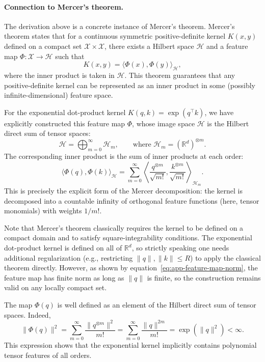 \documentclass{article}
\newcommand{\R}{\mathbb{R}}
\begin{document}
\paragraph{Connection to Mercer's theorem.}
The derivation above is a concrete instance of Mercer's theorem. Mercer’s theorem states that for a continuous symmetric positive-definite kernel $K(x,y)$ defined on a compact set $\mathcal{X}\times\mathcal{X}$, there exists a Hilbert space $\mathcal{H}$ and a feature map $\Phi:\mathcal{X}\to\mathcal{H}$ such that
\begin{equation}
    K(x,y)=\langle\Phi(x),\Phi(y)\rangle_{\mathcal{H}},
\end{equation}
where the inner product is taken in $\mathcal{H}$. This theorem guarantees that any positive-definite kernel can be represented as an inner product in some (possibly infinite-dimensional) feature space.

For the exponential dot-product kernel $K(q,k)=\exp(q^\top k)$, we have explicitly constructed this feature map $\Phi$, whose image space $\mathcal{H}$ is the Hilbert direct sum of tensor spaces:
\begin{equation}
    \mathcal{H}=\bigoplus_{m=0}^{\infty}\mathcal{H}_m,\qquad\text{where }\mathcal{H}_m=(\R^d)^{\otimes m}.
\end{equation}
The corresponding inner product is the sum of inner products at each order:
\begin{equation}
    \langle\Phi(q),\Phi(k)\rangle_{\mathcal{H}}
    =
    \sum_{m=0}^{\infty}
    \left\langle
    \frac{q^{\otimes m}}{\sqrt{m!}},
    \frac{k^{\otimes m}}{\sqrt{m!}}
    \right\rangle_{\mathcal{H}_m}.
\end{equation}
This is precisely the explicit form of the Mercer decomposition: the kernel is decomposed into a countable infinity of orthogonal feature functions (here, tensor monomials) with weights $1/m!$.

Note that Mercer's theorem classically requires the kernel to be defined on a compact domain and to satisfy square-integrability conditions. The exponential dot-product kernel is defined on all of $\R^d$, so strictly speaking one needs additional regularization (e.g., restricting $\|q\|,\|k\|\leq R$) to apply the classical theorem directly. However, as shown by equation~\eqref{eq:app-feature-map-norm}, the feature map has finite norm as long as $\|q\|$ is finite, so the construction remains valid on any locally compact set.

The map $\Phi(q)$ is well defined as an element of the Hilbert direct sum of tensor spaces. Indeed,
\begin{equation}
    \|\Phi(q)\|^2
    =
    \sum_{m=0}^{\infty}
    \frac{\|q^{\otimes m}\|^2}{m!}
    =
    \sum_{m=0}^{\infty}
    \frac{\|q\|^{2m}}{m!}
    =
    \exp(\|q\|^2)
    <
    \infty .
    \label{eq:app-feature-map-norm}
\end{equation}
This expression shows that the exponential kernel implicitly contains polynomial tensor features of all orders.
\end{document}

